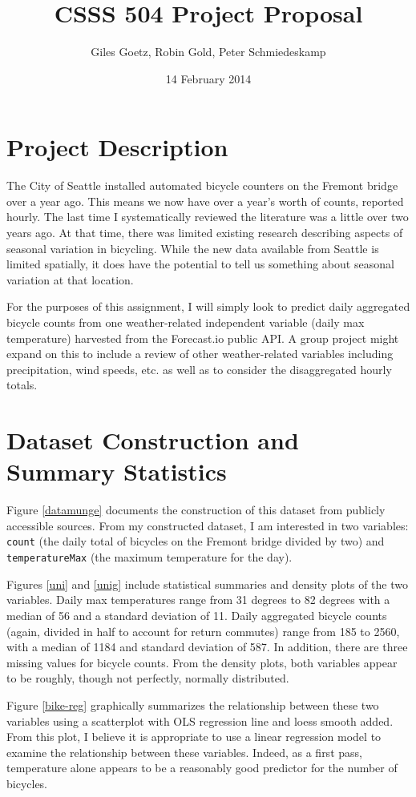 \documentclass[12pt,letterpaper,article]{memoir} %
\title{CSSS 504 Project Proposal}
\author{Giles Goetz, Robin Gold, Peter Schmiedeskamp}
\date{14 February 2014} %
\begin{document}
\maketitle


\chapter{Project Description}
The City of Seattle installed automated bicycle counters on the Fremont bridge over a year ago. This means we now have over a year's worth of counts, reported hourly. The last time I systematically reviewed the literature was a little over two years ago. At that time, there was limited existing research describing aspects of seasonal variation in bicycling. While the new data available from Seattle is limited spatially, it does have the potential to tell us something about seasonal variation at that location.

For the purposes of this assignment, I will simply look to predict daily aggregated bicycle counts from one weather-related independent variable (daily max temperature) harvested from the Forecast.io public API. A group project might expand on this to include a review of other weather-related variables including precipitation, wind speeds, etc. as well as to consider the disaggregated hourly totals.


\chapter{Dataset Construction and Summary Statistics}
Figure \ref{datamunge} documents the construction of this dataset from publicly accessible sources. From my constructed dataset, I am interested in two variables: \texttt{count} (the daily total of bicycles on the Fremont bridge divided by two) and \texttt{temperatureMax} (the maximum temperature for the day). 

Figures \ref{uni} and \ref{unig} include statistical summaries and density plots of the two variables. Daily max temperatures range from 31 degrees to 82 degrees with a median of 56 and a standard deviation of 11. Daily aggregated bicycle counts (again, divided in half to account for return commutes) range from 185 to 2560, with a median of 1184 and standard deviation of 587. In addition, there are three missing values for bicycle counts. From the density plots, both variables appear to be roughly, though not perfectly, normally distributed.

Figure \ref{bike-reg} graphically summarizes the relationship between these two variables using a scatterplot with OLS regression line and loess smooth added. From this plot, I believe it is appropriate to use a linear regression model to examine the relationship between these variables. Indeed, as a first pass, temperature alone appears to be a reasonably good predictor for the number of bicycles.

\end{document}
